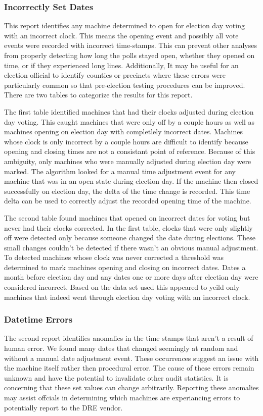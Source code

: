 \subsubsection{Incorrectly Set Dates}
This report identifies any machine determined to open for election day voting
with an incorrect clock.  This means the opening event and possibly all vote
events were recorded with incorrect time-stamps. This can prevent other analyses
from properly detecting how long the polls stayed open, whether they opened on
time, or if they experienced long lines. Additionally, It may be useful for an
election official to identify counties or precincts where these errors were
particularly common so that pre-election testing procedures can be improved.
There are two tables to categorize the results for this report.

The first table identified machines that had their clocks adjusted during
election day voting. This caught machines that were only off by a couple hours
as well as machines opening on election day with completlely incorrect dates.
Machines whose clock is only incorrect by a couple hours are difficult to
identify because opening and closing times are not a consistant point of
reference. Because of this ambiguity, only machines who were manually adjusted
during election day were marked. The algorithm looked for a manual time
adjustment event for any machine that was in an open state during election day.
If the machine then closed successfully on election day, the delta of the time
change is recorded. This time delta can be used to correctly adjust the recorded
opening time of the machine.

The second table found machines that opened on incorrect dates for voting but
never had their clocks corrected. In the first table, clocks that were only
slightly off were detected only because someone changed the date during
elections.  These small changes couldn't be detected if there wasn't an obvious
manual adjustment. To detected machines whose clock was never corrected a
threshold was determined to mark machines opening and closing on incorrect
dates. Dates a month before election day and any dates one or more days after
election day were considered incorrect.  Based on the data set used this
appeared to yeild only machines that indeed went through election day voting
with an incorrect clock.

\subsubsection{Datetime Errors}
The second report identifies anomalies in the time stamps that aren't a result
of human error. We found many dates that changed seemingly at random and without
a manual date adjustment event. These occurrences suggest an issue with the
machine itself rather then procedural error. The cause of these errors remain
unknown and have the potential to invalidate other audit statistics. It is
concerning that these set values can change arbitrarily. Reporting these
anomalies may assist offcials in determining which machines are experiancing
errors to potentially report to the DRE vendor.

